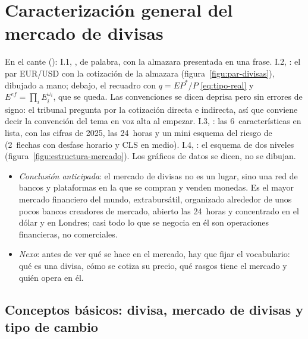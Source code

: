 \documentclass[11pt]{article}
\begin{document}
\section{Caracterización general del mercado de divisas}\label{sec:caracterizacion}

\begin{notaopositor}
En el cante (): I.1, , de palabra, con la almazara presentada en una frase. I.2, : el par EUR/USD con la cotización de la almazara (figura~\ref{figu:par-divisas}), dibujado a mano; debajo, el recuadro con $q=EP^{*}/P$ \eqref{eq:tipo-real} y $E^{ef}=\prod_iE_i^{\omega_i}$, que se queda. Las convenciones se dicen deprisa pero sin errores de signo: el tribunal pregunta por la cotización directa e indirecta, así que conviene decir la convención del tema en voz alta al empezar. I.3, : las 6~características en lista, con las cifras de 2025, las 24~horas y un mini esquema del riesgo de  (2~flechas con desfase horario y CLS en medio). I.4, : el esquema de dos niveles (figura~\ref{figu:estructura-mercado}). Los gráficos de datos se dicen, no se dibujan.
\end{notaopositor}

\begin{itemize}
\item \emph{Conclusión anticipada}: el mercado de divisas no es un lugar, sino una red de bancos y plataformas en la que se compran y venden monedas. Es el mayor mercado financiero del mundo, extrabursátil, organizado alrededor de unos pocos bancos creadores de mercado, abierto las 24~horas y concentrado en el dólar y en Londres; casi todo lo que se negocia en él son operaciones financieras, no comerciales.
\item \emph{Nexo}: antes de ver qué se hace en el mercado, hay que fijar el vocabulario: qué es una divisa, cómo se cotiza su precio, qué rasgos tiene el mercado y quién opera en él.
\end{itemize}

\subsection{Conceptos básicos: divisa, mercado de divisas y tipo de cambio}\label{sec:conceptos}
\end{document}
